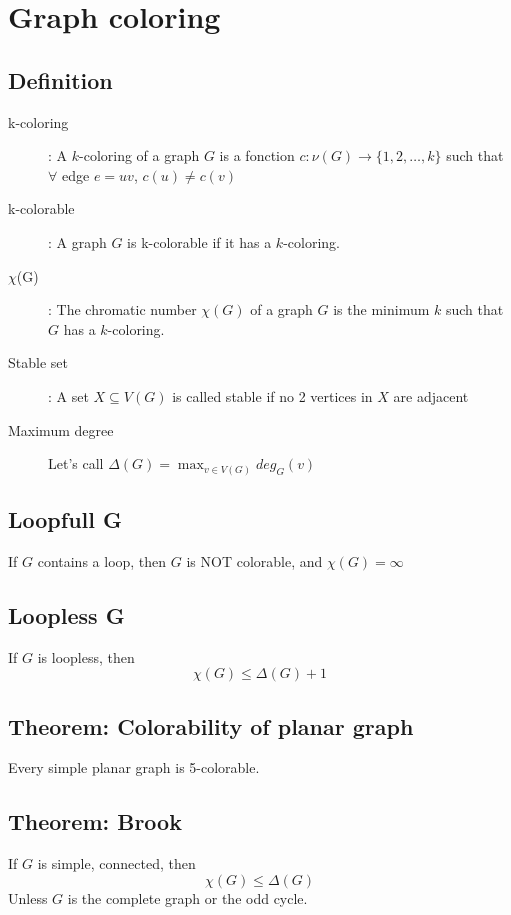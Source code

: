 \chapter{Graph coloring}
    \section{Definition}
        \begin{description}
            \item[k-coloring]: A $k$-coloring of a graph $G$ is a fonction $c:\nu(G)\rightarrow\{1, 2, \ldots, k\}$ such that $\forall$ edge $e=uv$, $c(u)\neq c(v)$
            \item[k-colorable]: A graph $G$ is k-colorable if it has a $k$-coloring.
            \item[$\chi$(G)]: The chromatic number $\chi(G)$ of a graph $G$ is the minimum $k$ such that $G$ has a $k$-coloring.
            \item[Stable set]: A set $X\subseteq V(G)$ is called stable if no 2 vertices in $X$ are adjacent
            \item[Maximum degree] Let's call $\Delta(G)=\max_{v\in V(G)}{deg_G(v)}$
        \end{description}
    \section{Loopfull G}
        If $G$ contains a loop, then $G$ is NOT colorable, and $\chi(G)=\infty$
    \section{Loopless G}
        If $G$ is loopless, then 
            \[\chi(G)\leq \Delta(G)+1\]
    \section{Theorem: Colorability of planar graph}
        Every simple planar graph is 5-colorable.
    \section{Theorem: Brook}
        If $G$ is simple, connected, then
            \[\chi(G)\leq\Delta(G)\]
        Unless $G$ is the complete graph or the odd cycle.
